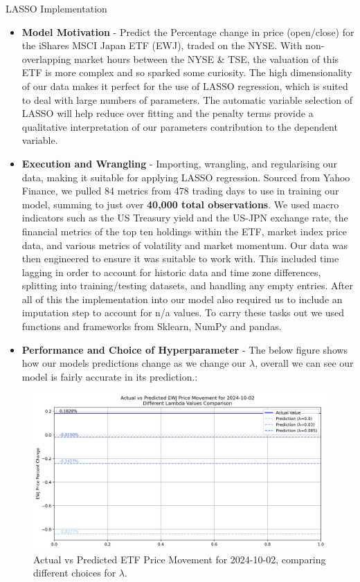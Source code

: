 \documentclass[final]{beamer}
\newlength{\twocolwid}
\begin{document}
\begin{frame}[t]
\begin{columns}[t]
\begin{column}{\twocolwid}
\begin{block}{LASSO Implementation}
\begin{itemize}
	\item \textbf{Model Motivation} - Predict the Percentage change in price (open/close) for the iShares MSCI Japan ETF (EWJ), traded on the NYSE. With non-overlapping market hours between the NYSE \& TSE, the valuation of this ETF is more complex and so sparked some curiosity. The high dimensionality of our data makes it perfect for the use of LASSO regression, which is suited to deal with large numbers of parameters. The automatic variable selection of LASSO will help reduce over fitting and the penalty terms provide a qualitative interpretation of our parameters contribution to the dependent variable.
	\item \textbf{Execution and Wrangling} - Importing, wrangling, and regularising our data, making it suitable for applying LASSO regression. Sourced from Yahoo Finance, we pulled 84 metrics from 478 trading days to use in training our model, summing to just over \textbf{40,000 total observations}. We used macro indicators such as the US Treasury yield and the US-JPN exchange rate, the financial metrics of the top ten holdings within the ETF, market index price data, and various metrics of volatility and market momentum. Our data was then engineered to ensure it was suitable to work with. This included time lagging in order to account for historic data and time zone differences, splitting into training/testing datasets, and handling any empty entries. After all of this the implementation into our model also required us to include an imputation step to account for n/a values. To carry these tasks out we used functions and frameworks from Sklearn, NumPy and pandas. 
	\item \textbf{Performance and Choice of Hyperparameter} - The below figure shows how our models predictions change as we change our $\lambda$, overall we can see our model is fairly accurate in its prediction.:
 \end{itemize}
    \begin{figure}   
    \includegraphics[width=0.4\linewidth]{predictions_comparison_lambda_final.png}
    \caption{Actual vs Predicted ETF Price Movement for 2024-10-02, comparing different choices for $\lambda$.}

\end{figure}
\end{block}
\end{column}
\end{columns}
\end{frame}
\end{document}
